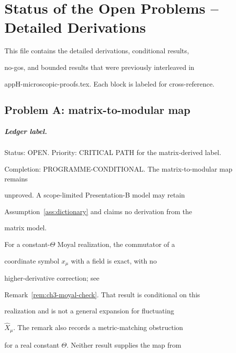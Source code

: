 \chapter{Status of the Open Problems -- Detailed Derivations}

\label{app:status-detailed}



This file contains the detailed derivations, conditional results,

no-gos, and bounded results that were previously interleaved in

appH-microscopic-proofs.tex. Each block is labeled for cross-reference.





\section{Problem A: matrix-to-modular map}

\label{sec:detailed-Problem A: matrix-to-modular map}



\paragraph{Ledger label.} \label{detail:sec-A-paragraphledgerlabel-0}

Status: OPEN. Priority: CRITICAL PATH for the matrix-derived label.

Completion: PROGRAMME-CONDITIONAL. The matrix-to-modular map remains

unproved. A scope-limited Presentation-B model may retain

Assumption~\ref{ass:dictionary} and claims no derivation from the

matrix model.



For a constant-\(\Theta\) Moyal realization, the commutator of a

coordinate symbol \(x_\mu\) with a field is exact, with no

higher-derivative correction; see

Remark~\ref{rem:ch3-moyal-check}. That result is conditional on this

realization and is not a general expansion for fluctuating

\(\hat X_\mu\). The remark also records a metric-matching obstruction

for a real constant \(\Theta\). Neither result supplies the map from

